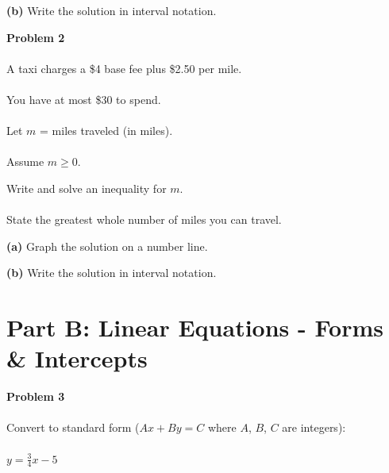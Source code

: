 \documentclass[12pt]{article}
\begin{document}
            \vspace{0.5cm}

            \textbf{(b)} Write the solution in interval notation.

            \newpage

            \textbf{Problem 2}\\\\
            A taxi charges a \$4 base fee plus \$2.50 per mile.\\\\
            You have at most \$30 to spend.\\\\
            Let $m$ = miles traveled (in miles).\\\\
            Assume $m \geq 0$.

            \vspace{0.5cm}

            Write and solve an inequality for $m$.\\\\
            State the greatest whole number of miles you can travel.

            \vspace{3cm}

            \textbf{(a)} Graph the solution on a number line.

            \vspace{0.5cm}

            \begin{center}
            \end{center}

            \vspace{0.5cm}

            \textbf{(b)} Write the solution in interval notation.

            \newpage

        \section*{Part B: Linear Equations - Forms \& Intercepts}

            \textbf{Problem 3}\\\\
            Convert to standard form ($Ax + By = C$ where $A$, $B$, $C$ are integers): \\\\
            $y = \displaystyle\frac{3}{4}x - 5$
\end{document}
